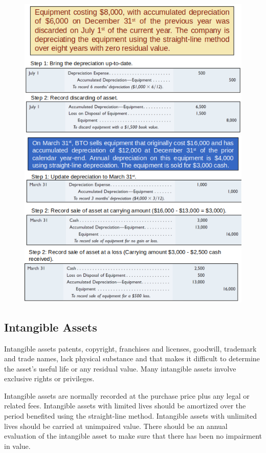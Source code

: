 \documentclass[../main.tex]{subfiles}
\begin{document}
	\begin{figure}[ht]
		\centering
		\includegraphics[width=1\columnwidth]{images/c8/discard_eg1.png}
		\includegraphics[width=1\columnwidth]{images/c8/discard_eg2.png}
		\includegraphics[width=1\columnwidth]{images/c8/discard_eg3.png}	
	\end{figure}

	\subsection{Intangible Assets}
	
	Intangible assets \eg patents, copyright, franchises and licenses, 
	goodwill, trademark and trade names, lack physical substance and that makes 
	it difficult 
	to 
	determine the asset’s useful life or any residual value. Many intangible 
	assets involve exclusive rights or privileges.
	
	Intangible assets are normally recorded at the purchase price plus any 
	legal or related fees. Intangible assets with limited lives should be 
	amortized over the period benefited using the straight-line method. 
	Intangible assets with unlimited lives should be carried at unimpaired 
	value. There should be an annual evaluation of the intangible asset to make 
	sure that there has been no impairment in value.
	
	
\end{document}
